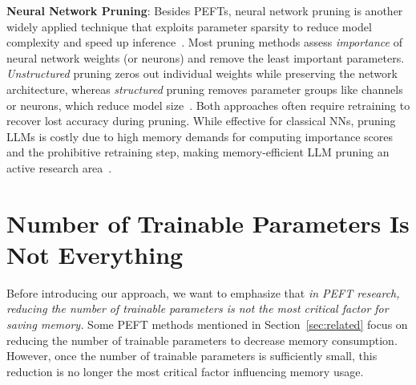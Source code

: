\textbf{Neural Network Pruning}:
Besides PEFTs, neural network pruning is another widely applied technique that exploits parameter sparsity to reduce model complexity and speed up inference~\citep{lecun1989optimal, han2015learning, han2017efficient, hoefler2021sparsity}. Most pruning methods assess \emph{importance} of neural network weights (or neurons) and remove the least important parameters. \emph{Unstructured} pruning zeros out individual weights while preserving the network architecture, whereas \emph{structured} pruning removes parameter groups like channels or neurons, which reduce model size~\citep{liu2021group, fang2023depgraph, ma2023llmpruner}. Both approaches often require retraining to recover lost accuracy during pruning. While effective for classical NNs, pruning LLMs is costly due to high memory demands for computing importance scores and the prohibitive retraining step, making memory-efficient LLM pruning an active research area~\citep{frantar2023sparsegpt,sunsimple}.


\section{Number of Trainable Parameters Is Not Everything}\label{sec:memory_trainable_parameters}
Before introducing our approach, we want to emphasize that \emph{in PEFT research, reducing the number of trainable parameters is not the most critical factor for saving memory.} Some PEFT methods mentioned in Section~\ref{sec:related} focus on reducing the number of trainable parameters to decrease memory consumption. However, once the number of trainable parameters is sufficiently small, this reduction is no longer the most critical factor influencing memory usage.

